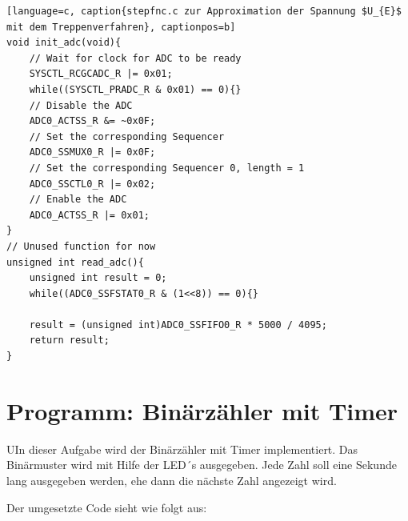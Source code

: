 \documentclass{article}
\begin{document}
\begin{lstlisting}[language=c, caption{stepfnc.c zur Approximation der Spannung $U_{E}$ mit dem Treppenverfahren}, captionpos=b]
void init_adc(void){
    // Wait for clock for ADC to be ready
    SYSCTL_RCGCADC_R |= 0x01;
    while((SYSCTL_PRADC_R & 0x01) == 0){}
    // Disable the ADC
    ADC0_ACTSS_R &= ~0x0F;
    // Set the corresponding Sequencer
    ADC0_SSMUX0_R |= 0x0F;
    // Set the corresponding Sequencer 0, length = 1
    ADC0_SSCTL0_R |= 0x02;
    // Enable the ADC
    ADC0_ACTSS_R |= 0x01;
}
// Unused function for now
unsigned int read_adc(){
    unsigned int result = 0;
    while((ADC0_SSFSTAT0_R & (1<<8)) == 0){}

    result = (unsigned int)ADC0_SSFIFO0_R * 5000 / 4095;
    return result;
}
\end{lstlisting}


\section{Programm: Binärzähler mit Timer}

\begin{task}
UIn dieser Aufgabe wird der Binärzähler mit Timer implementiert. Das Binärmuster wird mit Hilfe der LED´s ausgegeben. Jede Zahl soll eine Sekunde lang ausgegeben werden, ehe dann die nächste Zahl angezeigt wird. 
\end{task}
  
Der umgesetzte Code sieht wie folgt aus:
  
\end{document}
